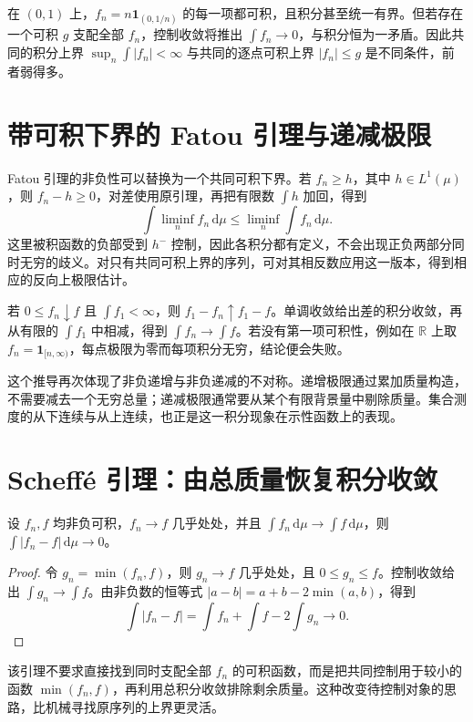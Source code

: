 \documentclass[UTF8,12pt,a4paper,fontset=fandol]{ctexbook}
\begin{document}
\begin{example}[不能把各项可积误当成共同控制]
在 $(0,1)$ 上，$f_n=n\mathbf1_{(0,1/n)}$ 的每一项都可积，且积分甚至统一有界。但若存在一个可积 $g$ 支配全部 $f_n$，控制收敛将推出 $\int f_n\to0$，与积分恒为一矛盾。因此共同的积分上界 $\sup_n\int|f_n|<\infty$ 与共同的逐点可积上界 $|f_n|\leq g$ 是不同条件，前者弱得多。
\end{example}

\section{带可积下界的 Fatou 引理与递减极限}
Fatou 引理的非负性可以替换为一个共同可积下界。若 $f_n\geq h$，其中 $h\in L^1(\mu)$，则 $f_n-h\geq0$，对差使用原引理，再把有限数 $\int h$ 加回，得到
\[
 \int\liminf_nf_n\,\mathrm d\mu
 \leq\liminf_n\int f_n\,\mathrm d\mu.
\]
这里被积函数的负部受到 $h^-$ 控制，因此各积分都有定义，不会出现正负两部分同时无穷的歧义。对只有共同可积上界的序列，可对其相反数应用这一版本，得到相应的反向上极限估计。

若 $0\leq f_n\downarrow f$ 且 $\int f_1<\infty$，则 $f_1-f_n\uparrow f_1-f$。单调收敛给出差的积分收敛，再从有限的 $\int f_1$ 中相减，得到 $\int f_n\to\int f$。若没有第一项可积性，例如在 $\mathbb R$ 上取 $f_n=\mathbf1_{[n,\infty)}$，每点极限为零而每项积分无穷，结论便会失败。

这个推导再次体现了非负递增与非负递减的不对称。递增极限通过累加质量构造，不需要减去一个无穷总量；递减极限通常要从某个有限背景量中剔除质量。集合测度的从下连续与从上连续，也正是这一积分现象在示性函数上的表现。

\section{Scheffé 引理：由总质量恢复积分收敛}
\begin{theorem}[Scheffé 引理]
设 $f_n,f$ 均非负可积，$f_n\to f$ 几乎处处，并且 $\int f_n\,\mathrm d\mu\to\int f\,\mathrm d\mu$，则 $\int|f_n-f|\,\mathrm d\mu\to0$。
\label{thm:mt-scheffe}
\end{theorem}
\begin{proof}
令 $g_n=\min(f_n,f)$，则 $g_n\to f$ 几乎处处，且 $0\leq g_n\leq f$。控制收敛给出 $\int g_n\to\int f$。由非负数的恒等式 $|a-b|=a+b-2\min(a,b)$，得到
\[
 \int|f_n-f|=\int f_n+\int f-2\int g_n\longrightarrow0.
\]
\end{proof}
该引理不要求直接找到同时支配全部 $f_n$ 的可积函数，而是把共同控制用于较小的函数 $\min(f_n,f)$，再利用总积分收敛排除剩余质量。这种改变待控制对象的思路，比机械寻找原序列的上界更灵活。
\end{document}
